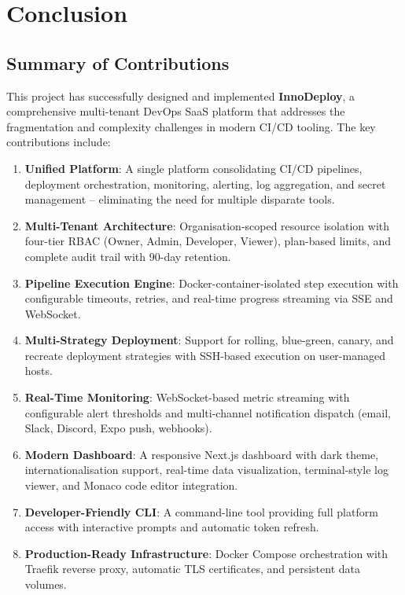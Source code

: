 \documentclass[12pt,a4paper,twoside]{report}
\begin{document}
\chapter{Conclusion}

\section{Summary of Contributions}

This project has successfully designed and implemented \textbf{InnoDeploy}, a comprehensive multi-tenant DevOps SaaS platform that addresses the fragmentation and complexity challenges in modern CI/CD tooling. The key contributions include:

\begin{enumerate}
  \item \textbf{Unified Platform}: A single platform consolidating CI/CD pipelines, deployment orchestration, monitoring, alerting, log aggregation, and secret management -- eliminating the need for multiple disparate tools.

  \item \textbf{Multi-Tenant Architecture}: Organisation-scoped resource isolation with four-tier RBAC (Owner, Admin, Developer, Viewer), plan-based limits, and complete audit trail with 90-day retention.

  \item \textbf{Pipeline Execution Engine}: Docker-container-isolated step execution with configurable timeouts, retries, and real-time progress streaming via SSE and WebSocket.

  \item \textbf{Multi-Strategy Deployment}: Support for rolling, blue-green, canary, and recreate deployment strategies with SSH-based execution on user-managed hosts.

  \item \textbf{Real-Time Monitoring}: WebSocket-based metric streaming with configurable alert thresholds and multi-channel notification dispatch (email, Slack, Discord, Expo push, webhooks).

  \item \textbf{Modern Dashboard}: A responsive Next.js dashboard with dark theme, internationalisation support, real-time data visualization, terminal-style log viewer, and Monaco code editor integration.

  \item \textbf{Developer-Friendly CLI}: A command-line tool providing full platform access with interactive prompts and automatic token refresh.

  \item \textbf{Production-Ready Infrastructure}: Docker Compose orchestration with Traefik reverse proxy, automatic TLS certificates, and persistent data volumes.
\end{enumerate}
\end{document}
